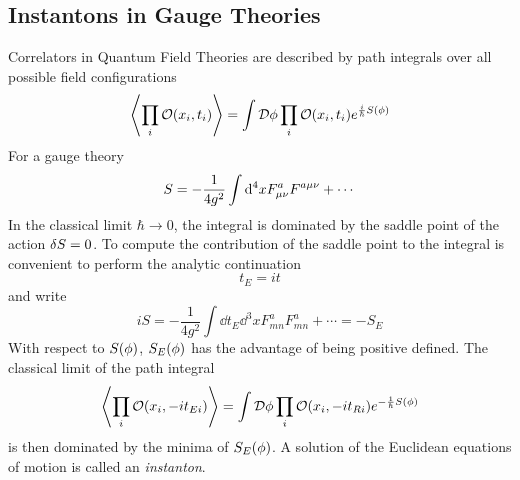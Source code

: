 \subsection{Instantons in Gauge Theories}
Correlators in Quantum Field Theories are described by path integrals over all possible field configurations
\begin{equation}
  \ev{\prod_i\mathcal{O}(x_i,t_i)}=\int\mathcal{D}\f \prod_i\mathcal{O}(x_i,t_i)e^{\frac{i}{\hbar}S(\f )}
\end{equation}
For a gauge theory
\begin{equation}
  S=-\frac{1}{4g^2}\int\dd^4xF^{a}_{\mu\nu }F^{a\mu\nu }+\cdots
\end{equation}
In the classical limit $\hbar\to 0$, the integral is dominated by the saddle point of the action $\delta S=0$. To compute the contribution of the saddle point to the integral is convenient to perform the analytic continuation
\begin{equation}
  t_E=it
\end{equation}
and write
\begin{equation}
  iS=-\frac{1}{4g^2}\int\dd t_E\dd^3xF^{a}_{mn}F^{a}_{mn}+\cdots=-S_E
\end{equation}
With respect to $S(\phi )$, $S_E(\phi )$ has the advantage of being positive defined. The classical limit of the path integral
\begin{equation}
  \ev{\prod_i\mathcal{O}(x_i,-it_{Ei})}=\int\mathcal{D}\f \prod_i\mathcal{O}(x_i,-it_{Ri})e^{-\frac{1}{\hbar}S(\f )}
\end{equation}
is then dominated by the minima of $S_E(\phi )$. A solution of the Euclidean equations of motion is called an \textit{instanton}.


